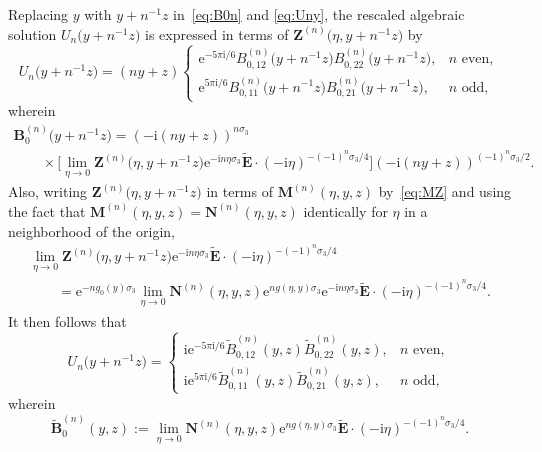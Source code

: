 \documentclass[pdftex]{sigma}
\numberwithin{equation}{section}
\begin{document}
Replacing $y$ with $y+n^{-1}z$ in~\eqref{eq:B0n} and \eqref{eq:Uny}, the rescaled algebraic solution $U_n\bigl(y+n^{-1}z\bigr)$ is expressed in terms of $\mathbf{Z}^{(n)}\bigl(\eta,y+n^{-1}z\bigr)$ by
\begin{equation*}
U_n\bigl(y+n^{-1}z\bigr) = (ny+z)\begin{cases}\mathrm{e}^{-5\pi\mathrm{i}/6}B^{(n)}_{0,12}\bigl(y+n^{-1}z\bigr)B^{(n)}_{0,22}\bigl(y+n^{-1}z\bigr),&\text{$n$ even},\\\mathrm{e}^{5\pi\mathrm{i}/6}B^{(n)}_{0,11}\bigl(y+n^{-1}z\bigr)B^{(n)}_{0,21}\bigl(y+n^{-1}z\bigr),&\text{$n$ odd},\end{cases}
\end{equation*}
wherein
\begin{gather*}
 \mathbf{B}_0^{(n)}\bigl(y+n^{-1}z\bigr)=(-\mathrm{i} (ny+z))^{n\sigma_3} \\
\qquad{}\times\Big[\lim_{\eta\to 0}\mathbf{Z}^{(n)}\bigl(\eta,y+n^{-1}z\bigr)\mathrm{e}^{-\mathrm{i} n\eta\sigma_3}\widetilde{\mathbf{E}}\cdot(-\mathrm{i} \eta)^{-(-1)^n\sigma_3/4}\Big](-\mathrm{i} (ny+z))^{(-1)^n\sigma_3/2}.
\end{gather*}
Also, writing $\mathbf{Z}^{(n)}\bigl(\eta,y+n^{-1}z\bigr)$ in terms of $\mathbf{M}^{(n)}(\eta,y,z)$ by~\eqref{eq:MZ} and using the fact that $\mathbf{M}^{(n)}(\eta,y,z)=\mathbf{N}^{(n)}(\eta,y,z)$ identically for $\eta$ in a neighborhood of the origin, %
\begin{gather*}
\lim_{\eta\to 0}\mathbf{Z}^{(n)}\bigl(\eta,y+n^{-1}z\bigr)\mathrm{e}^{-\mathrm{i} n\eta\sigma_3}\widetilde{\mathbf{E}}\cdot (-\mathrm{i}\eta)^{-(-1)^n\sigma_3/4} \\
\qquad = \mathrm{e}^{-ng_0(y)\sigma_3}\lim_{\eta\to 0}\mathbf{N}^{(n)}(\eta,y,z)\mathrm{e}^{ng(\eta,y)\sigma_3}\mathrm{e}^{-\mathrm{i} n\eta\sigma_3}\widetilde{\mathbf{E}}\cdot (-\mathrm{i}\eta)^{-(-1)^n\sigma_3/4}.
\end{gather*}
It then follows that
\begin{equation*}
U_n\bigl(y+n^{-1}z\bigr) = \begin{cases}\mathrm{i}\mathrm{e}^{-5\pi\mathrm{i}/6}\widetilde{B}^{(n)}_{0,12}(y,z)\widetilde{B}^{(n)}_{0,22}(y,z),&\text{$n$ even},\\\mathrm{i}\mathrm{e}^{5\pi\mathrm{i}/6}\widetilde{B}^{(n)}_{0,11}(y,z)\widetilde{B}^{(n)}_{0,21}(y,z),&\text{$n$ odd},\end{cases}
\end{equation*}
wherein
\begin{equation*}
\widetilde{\mathbf{B}}^{(n)}_0(y,z):=\lim_{\eta\to 0}\mathbf{N}^{(n)}(\eta,y,z)\mathrm{e}^{ng(\eta,y)\sigma_3}\widetilde{\mathbf{E}}\cdot (-\mathrm{i}\eta)^{-(-1)^n\sigma_3/4}.
\end{equation*}
\end{document}
